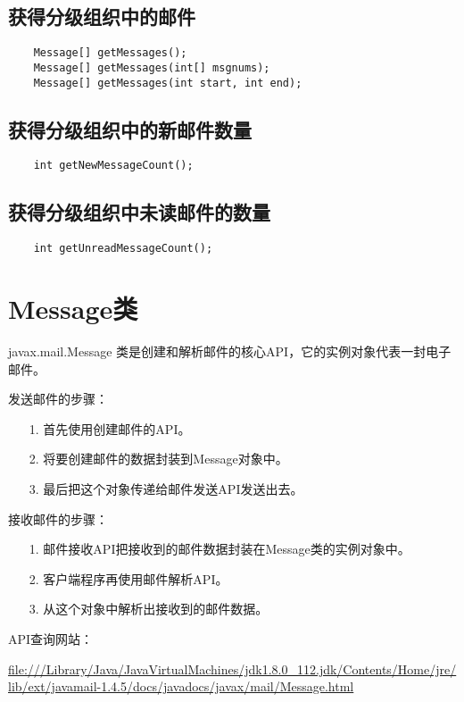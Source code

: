 \documentclass[a4paper,left=2.5cm,right=2.5cm,11pt]{article}
\begin{document}
\subsection{获得分级组织中的邮件}
	\begin{lstlisting}
	Message[] getMessages();
	Message[] getMessages(int[] msgnums);
	Message[] getMessages(int start, int end);
	\end{lstlisting}

\subsection{获得分级组织中的新邮件数量}
	\begin{lstlisting}
	int getNewMessageCount();
	\end{lstlisting}

\subsection{获得分级组织中未读邮件的数量}
	\begin{lstlisting}
	int getUnreadMessageCount();
	\end{lstlisting}

\section{Message类}
	 javax.mail.Message 类是创建和解析邮件的核心API，它的实例对象代表一封电子邮件。

	 发送邮件的步骤：
	 \begin{itemize}
		 \item[1.] 首先使用创建邮件的API。
		 \item[2.] 将要创建邮件的数据封装到Message对象中。
		 \item[3.] 最后把这个对象传递给邮件发送API发送出去。  
	 \end{itemize}

	 接收邮件的步骤：
	 \begin{itemize}
		 \item[1.] 邮件接收API把接收到的邮件数据封装在Message类的实例对象中。
		 \item[2.] 客户端程序再使用邮件解析API。
		 \item[3.] 从这个对象中解析出接收到的邮件数据。 
	 \end{itemize}

	 API查询网站：\par
	 \url{file:///Library/Java/JavaVirtualMachines/jdk1.8.0_112.jdk/Contents/Home/jre/lib/ext/javamail-1.4.5/docs/javadocs/javax/mail/Message.html}
\end{document}
